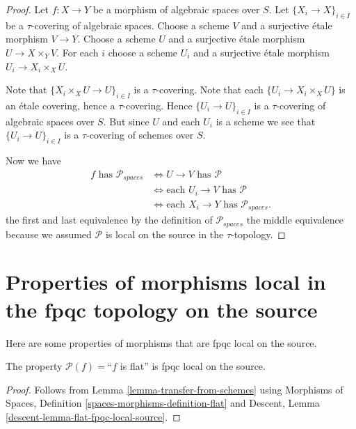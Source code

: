 \begin{proof}
Let $f : X \to Y$ be a morphism of algebraic spaces over $S$.
Let $\{X_i \to X\}_{i \in I}$ be a $\tau$-covering of algebraic spaces.
Choose a scheme $V$ and a surjective \'etale morphism $V \to Y$.
Choose a scheme $U$ and a surjective \'etale morphism $U \to X \times_Y V$.
For each $i$ choose a scheme $U_i$ and a surjective \'etale morphism
$U_i \to X_i \times_X U$.

\medskip\noindent
Note that $\{X_i \times_X U \to U\}_{i \in I}$ is a $\tau$-covering.
Note that each $\{U_i \to X_i \times_X U\}$ is an \'etale covering,
hence a $\tau$-covering. Hence $\{U_i \to U\}_{i \in I}$ is a
$\tau$-covering of algebraic spaces over $S$. But since $U$ and each $U_i$
is a scheme we see that $\{U_i \to U\}_{i \in I}$ is a
$\tau$-covering of schemes over $S$.

\medskip\noindent
Now we have
\begin{align*}
f \text{ has }\mathcal{P}_{spaces}
& \Leftrightarrow
U \to V \text{ has }\mathcal{P} \\
& \Leftrightarrow
\text{each }U_i \to V \text{ has }\mathcal{P} \\
& \Leftrightarrow
\text{each }X_i \to Y\text{ has }\mathcal{P}_{spaces}.
\end{align*}
the first and last equivalence by the definition of
$\mathcal{P}_{spaces}$ the middle equivalence because we assumed
$\mathcal{P}$ is local on the source in the $\tau$-topology.
\end{proof}






\section{Properties of morphisms local in the fpqc topology on the source}
\label{section-fpqc-local-source}

\noindent
Here are some properties of morphisms that are fpqc local on the source.

\begin{lemma}
\label{lemma-flat-fpqc-local-source}
The property $\mathcal{P}(f)=$``$f$ is flat'' is fpqc local on the source.
\end{lemma}

\begin{proof}
Follows from
Lemma \ref{lemma-transfer-from-schemes}
using
Morphisms of Spaces, Definition \ref{spaces-morphisms-definition-flat}
and
Descent, Lemma \ref{descent-lemma-flat-fpqc-local-source}.
\end{proof}










